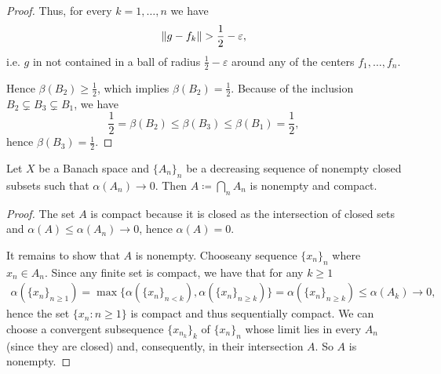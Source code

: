 \begin{proof}
  Thus, for every \( k = 1, \ldots, n \) we have
  \begin{equation*}
    \left\Vert g - f_k \right\Vert > \frac 1 2 - \varepsilon,
  \end{equation*}
  i.e. \( g \) in not contained in a ball of radius \( \frac 1 2 - \varepsilon \) around any of the centers \( f_1, \ldots, f_n \).

  Hence \( \beta(B_2) \geq \frac 1 2 \), which implies \( \beta(B_2) = \frac 1 2 \). Because of the inclusion \( B_2 \subsetneq B_3 \subsetneq B_1 \), we have
  \begin{equation*}
    \frac 1 2 = \beta(B_2) \leq \beta(B_3) \leq \beta(B_1) = \frac 1 2,
  \end{equation*}
  hence \( \beta(B_3) = \frac 1 2 \).
\end{proof}

\begin{theorem}\label{thm:noncompact_kuratowskis_lemma}
  Let \( X \) be a Banach space and \( \{ A_n \}_n \) be a decreasing sequence of nonempty closed subsets such that \( \alpha(A_n) \to 0 \). Then \( A \coloneqq \bigcap_n A_n \) is nonempty and compact.
\end{theorem}
\begin{proof}
  The set \( A \) is compact because it is closed as the intersection of closed sets and \( \alpha(A) \leq \alpha(A_n) \to 0 \), hence \( \alpha(A) = 0 \).

  It remains to show that \( A \) is nonempty.
  Choose\AOC any sequence \( \{ x_n \}_n \) where \( x_n \in A_n \). Since any finite set is compact, we have that for any \( k \geq 1 \)
  \begin{align*}
    \alpha(\{ x_n \}_{n \geq 1})
    =
    \max\{ \alpha(\{ x_n \}_{n < k}), \alpha(\{ x_n \}_{n \geq k}) \}
    =
    \alpha(\{ x_n \}_{n \geq k})
    \leq
    \alpha(A_k) \to 0,
  \end{align*}
  hence the set \( \{ x_n \colon n \geq 1 \} \) is compact and thus sequentially compact. We can choose a convergent subsequence \( \{ x_{n_k} \}_k \) of \( \{ x_n \}_n \) whose limit lies in every \( A_n \) (since they are closed) and, consequently, in their intersection \( A \). So \( A \) is nonempty.
\end{proof}
